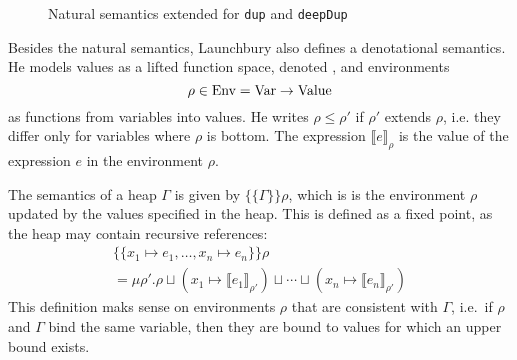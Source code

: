 \documentclass[preprint]{sigplanconf}
\theoremstyle{nonumberplain}
\newcommand{\li}{\lstinline[style=Haskell]}
\begin{document}
\begin{figure*}
\parskip1cm
\caption{Natural semantics extended for \li-dup- and \li-deepDup-}
\label{fig:semrules}
\end{figure*}

\newcommand{\dsem}[2]{\llbracket #1 \rrbracket_{#2}}
\newcommand{\esem}[1]{\{\!\!\{#1\}\!\!\}}
\newcommand{\case}[1]{\par\vspace{\standardvspace}\noindent\textbf{Case:} #1\nopagebreak\par\noindent\ignorespaces}

Besides the natural semantics, Launchbury also defines a denotational semantics. He models values as a lifted function space, denoted \sValue, and environments
\[
\rho \in \text{Env} = \text{Var} \to \text{Value}
\]
as functions from variables into values. He writes $\rho \le \rho'$ if $\rho'$ extends $\rho$, i.e. they differ only for variables where $\rho$ is bottom. The expression $\dsem e \rho$ is the value of the expression $e$ in the environment $\rho$.

The semantics of a heap $\Gamma$ is given by $\esem \Gamma \rho$, which is is the environment $\rho$ updated by the values specified in the heap. This is defined as a fixed point, as the heap may contain recursive references:
\begin{multline*}
\esem{ x_1\mapsto e_1,\ldots,x_n\mapsto e_n}\rho \\
= \mu \rho'. \rho \sqcup (x_1 \mapsto \dsem{e_1}{\rho'}) \sqcup \cdots \sqcup (x_n \mapsto \dsem{e_n}{\rho'})
\end{multline*}
This definition maks sense on environments $\rho$ that are consistent with $\Gamma$, i.e.\ if $\rho$ and $\Gamma$ bind the same variable, then they are bound to values for which an upper bound exists.
\end{document}
